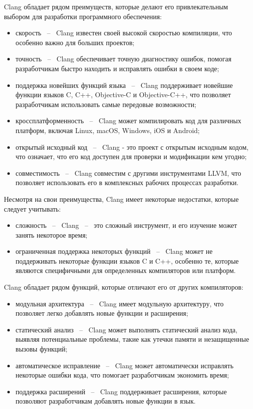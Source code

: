 Clang обладает рядом преимуществ, которые делают его привлекательным выбором для разработки программного обеспечения:

\begin{itemize}
    \item скорость ~--~ Clang известен своей высокой скоростью компиляции, что особенно важно для больших проектов;
    \item точность ~--~ Clang обеспечивает точную диагностику ошибок, помогая разработчикам быстро находить и исправлять ошибки в своем коде;
    \item поддержка новейших функций языка ~--~ Clang поддерживает новейшие функции языков C, C++, Objective-C и Objective-C++, что позволяет разработчикам использовать самые передовые возможности;
    \item кроссплатформенность ~--~ Clang может компилировать код для различных платформ, включая Linux, macOS, Windows, iOS и Android;
    \item открытый исходный код ~--~ Clang - это проект с открытым исходным кодом, что означает, что его код доступен для проверки и модификации кем угодно;
    \item совместимость ~--~ Clang совместим с другими инструментами LLVM, что позволяет использовать его в комплексных рабочих процессах разработки.
\end{itemize}

Несмотря на свои преимущества, Clang имеет некоторые недостатки, которые следует учитывать:
\begin{itemize}
    \item сложность ~--~ Clang ~--~ это сложный инструмент, и его изучение может занять некоторое время;
    \item ограниченная поддержка некоторых функций ~--~ Clang может не поддерживать некоторые функции языков C и C++, особенно те, которые являются специфичными для определенных компиляторов или платформ.
\end{itemize}

Clang обладает рядом функций, которые отличают его от других компиляторов:

\begin{itemize}
    \item модульная архитектура ~--~ Clang имеет модульную архитектуру, что позволяет легко добавлять новые функции и расширения;
    \item статический анализ ~--~ Clang может выполнять статический анализ кода, выявляя потенциальные проблемы, такие как утечки памяти и незащищенные вызовы функций;
    \item автоматическое исправление ~--~ Clang может автоматически исправлять некоторые ошибки кода, что помогает разработчикам экономить время;
    \item поддержка расширений ~--~ Clang поддерживает расширения, которые позволяют разработчикам добавлять новые функции в язык.
\end{itemize}

